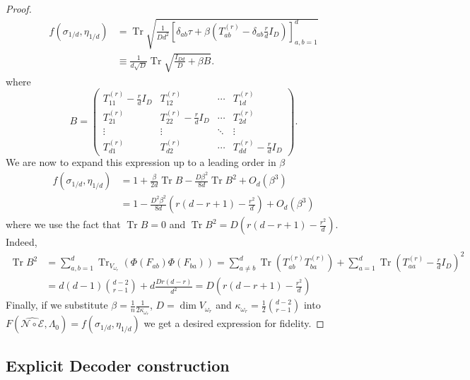 \documentclass[11pt,letterpaper]{article}
\theoremstyle{plain}
\theoremstyle{plain}
\theoremstyle{plain}
\theoremstyle{plain}
\theoremstyle{plain}
\theoremstyle{plain}
\theoremstyle{plain}
\theoremstyle{definition}
\theoremstyle{plain}
\begin{document}
\begin{proof}
\[\begin{aligned}
    f\left(\sigma_{1/d}, \eta_{1/d}\right)&=\operatorname{Tr} \sqrt{\frac{1}{Dd^2}\left[\delta_{a b} \tau+\beta \left(T_{a b}^{(r)}-
    \delta_{a b} \frac{r}{d} I_D\right)\right]_{a, b=1}^d}\\&\equiv\frac{1}{d \sqrt{D}} \operatorname{Tr} \sqrt{\frac{I_{D d}}{D}+\beta B} .
\end{aligned}
\]
where 
\[
    B=\left(\begin{array}{cccc}
    T_{11}^{(r)}-\frac{r}{d} I_D & T_{12}^{(r)} & \cdots & T_{1 d}^{(r)} \\
    T_{21}^{(r)} & T_{22}^{(r)}-\frac{r}{d} I_D & \cdots & T_{2 d}^{(r)} \\
    \vdots & \vdots & \ddots & \vdots \\
    T_{d 1}^{(r)} & T_{d 2}^{(r)} & \cdots & T_{d d}^{(r)}-\frac{r}{d} I_D
    \end{array}\right).
\]
We are now to expand this expression up to a leading order in $\beta$
\[
\begin{aligned}
        f\left(\sigma_{1/d}, \eta_{1/d}\right)&=1+\frac{\beta}{2 d} \operatorname{Tr} B-\frac{D \beta^2}{8 d} \operatorname{Tr} B^2+O_{d}\left(\beta^3\right)
        \\&=1-\frac{D^2 \beta^2}{8 d}\left(r(d-r+1)-\frac{r^2}{d}\right)+O_{d}\left(\beta^3\right)
\end{aligned}
\]
where we use the fact that $\operatorname{Tr} B=0$ and $\operatorname{Tr} B^2=D\left(r(d-r+1)-\frac{r^2}{d}\right)$. Indeed, 
$$
\begin{aligned}
    \operatorname{Tr} B^2&=\sum_{a, b=1}^d \operatorname{Tr}_{V_{\omega_r}}\left(\Phi\left(F_{a b}\right) \Phi\left(F_{b a}\right)\right)=\sum_{a\neq b}^d\operatorname{Tr}\left(T_{a b}^{(r)} T_{b a}^{(r)}\right)+\sum_{a=1}^d \operatorname{Tr}\left(T_{a a}^{(r)}-\frac{r}{d} I_D\right)^2\\&=d(d-1)\binom{d-2}{r-1}+d\frac{Dr(d-r)}{d^2}=D\left(r(d-r+1)-\frac{r^2}{d}\right)
\end{aligned}
$$
Finally, if we substitute $\beta=\frac{1}{n} \frac{1}{2\kappa_{\omega_r}}$, $D=\operatorname{dim} V_{\omega_r}$ and 
$\kappa_{\omega_r}=\frac{1}{2}\binom{d-2}{r-1}$ into $F(\widehat{\mathcal{N} \circ \mathcal{E}}, \Lambda_0)=f(\sigma_{1/d}, \eta_{1/d
})$ we get a desired expression for fidelity.
\end{proof}

\subsection{Explicit Decoder construction}\label{subsec:supple_decoder}
\end{document}
